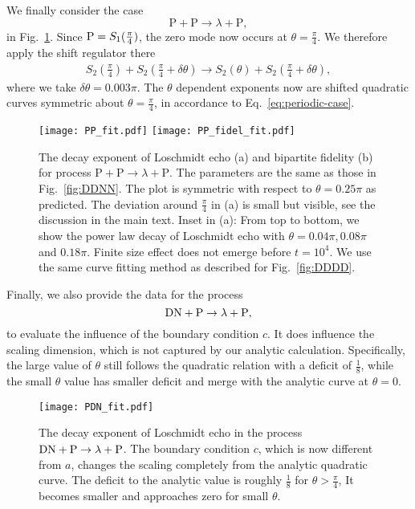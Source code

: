 We finally consider the case
\begin{equation}
\text{P}+\text{P}\rightarrow\lambda+\text{P},
\end{equation}
in Fig.~\ref{fig:PPPP}. Since ${\rm P} = S_1( \frac{\pi}{4} ) $, the zero mode now occurs at $\theta = \frac{\pi}{4}$. We therefore apply the shift regulator there 
\begin{equation}
\begin{aligned}
\label{eq:approx_DNDN}
S_2\left(\frac{\pi}{4}\right)+S_2\left(\frac{\pi}{4}+\delta\theta\right)\rightarrow S_2(\theta)+S_2\left(\frac{\pi}{4}+\delta\theta\right),
\end{aligned}
\end{equation}
where we take $\delta\theta=0.003\pi$. The $\theta$ dependent exponents now are shifted quadratic curves symmetric about $ \theta = \frac{\pi}{4}$, in accordance to Eq.~\eqref{eq:periodic-case}.

\begin{figure}
  \centering
  \texttt{[image: PP\_fit.pdf]}
    \texttt{[image: PP\_fidel\_fit.pdf]}
    \caption{The decay exponent of Loschmidt echo (a) and bipartite fidelity (b) for process $\text{P}+\text{P}\rightarrow\lambda+\text{P}$. The parameters are the same as those in Fig.~\ref{fig:DDNN}. The plot is symmetric with respect to $\theta=0.25\pi$ as predicted. The deviation around $\frac{\pi}{4}$ in (a) is small but visible, see the discussion in the main text. Inset in (a): From top to bottom, we show the power law decay of Loschmidt echo with $\theta=0.04\pi, 0.08\pi $ and $0.18\pi$. Finite size effect does not emerge before $t=10^{4}$. We use the same curve fitting method as described for Fig.~\ref{fig:DDDD}.}
    \label{fig:PPPP}
\end{figure}

Finally, we also provide the data for the process
\begin{equation}
{\rm DN} + {\rm P} \rightarrow \lambda  + {\rm P},
\end{equation}
to evaluate the influence of the boundary condition $c$. It {\rm does} influence the scaling dimension, which is not captured by our analytic calculation. Specifically, the large value of $\theta$ still follows the quadratic relation with a deficit of $\frac{1}{8}$, while the small $\theta$ value has smaller deficit and merge with the analytic curve at $\theta = 0$. 
\begin{figure}[htb]
\centering
\texttt{[image: PDN\_fit.pdf]}
\caption{The decay exponent of Loschmidt echo in the process ${\rm DN} + {\rm P} \rightarrow \lambda  + {\rm P}$. The boundary condition $c$, which is now different from $a$, changes the scaling completely from the analytic quadratic curve. The deficit to the analytic value is roughly $\frac{1}{8}$ for $\theta > \frac{\pi}{4}$, It becomes smaller and approaches zero for small $\theta$. }
\label{fig:PDN_fit}
\end{figure}

